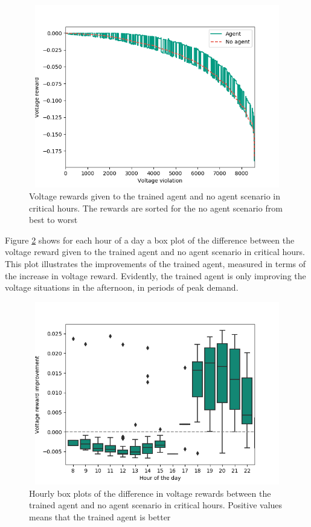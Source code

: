 \documentclass[class=book, crop=false, 11pt]{standalone}
\begin{document}
\begin{figure}[h]
    \center
\includegraphics[height=8cm, width=12cm]{figures/config1_sorted_voltage.png}
    \caption[size = 9]{Voltage rewards given to the trained agent and no agent scenario in critical hours. The rewards are sorted for the no agent scenario from best to worst}
    \label{fig:results:config1_sorted_voltage}
\end{figure}


Figure \ref{fig:results:config1_improvement_voltage} shows for each hour of a day a box plot of the difference between the voltage reward given to the trained agent and no agent scenario in critical hours. This plot illustrates the improvements of the trained agent, measured in terms of the increase in voltage reward. Evidently, the trained agent is only improving the voltage situations in the afternoon, in periods of peak demand. 

\begin{figure}[h]
    \center
\includegraphics[height=8cm, width=12cm]{figures/config1_improvement_voltage.png}
    \caption[size = 9]{Hourly box plots of the difference in voltage rewards between the trained agent and no agent scenario in critical hours. Positive values means that the trained agent is better}
    \label{fig:results:config1_improvement_voltage}
\end{figure}
\end{document}
